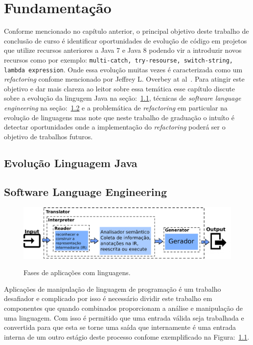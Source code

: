%
%
\chapter{Fundamentação}
Conforme mencionado no capítulo anterior, o principal objetivo deste trabalho de conclusão de curso é identificar oportunidades de evolução de código em projetos que utilize recursos anteriores a Java 7 e Java 8 podendo vir a introduzir novos recursos como por exemplo: \texttt{multi-catch, try-resourse, switch-string, lambda expression}. Onde essa evolução muitas vezes é caracterizada como um \textit{refactoring} confome mencionado por Jeffrey L. Overbey at al~\cite{Overbey:2009}. Para atingir este objetivo e dar mais clareza ao leitor sobre essa temática esse capítulo discute sobre a evolução da lingugem Java na seção:~\ref{sec:evolucaoJava},  técnicas de \textit{software language engineering} na seção:~\ref{sec:softEng} e a problemática de \textit{refactoring} em particular na evolução de linguagens mas note que neste trabalho de graduação o intuíto é detectar oportunidades onde a implementação do \textit{refactoring} poderá ser o objetivo de trabalhos futuros. %

\section{Evolução Linguagem Java}\label{sec:evolucaoJava}


\section{Software Language Engineering}\label{sec:softEng}

\begin{figure}[h]
	\center
	\includegraphics[scale=0.9]{Imagens/stagesLanguageApp}
	\label{fig:stagesLanguageApp}
	\caption{Fases de aplicações com linguagens.}
\end{figure}

Aplicações de manipulação de linguagem de programação é um trabalho desafiador e complicado por isso é necessário dividir este trabalho em componentes que quando combinados proporcionam a análise e manipulação de uma linguagem. Com isso é permitido que uma entrada válida seja trabalhada e convertida para que esta se torne uma saída que internamente é uma entrada interna de um outro estágio deste processo confome exemplificado na Figura:~\ref{fig:stagesLanguageApp}. 

